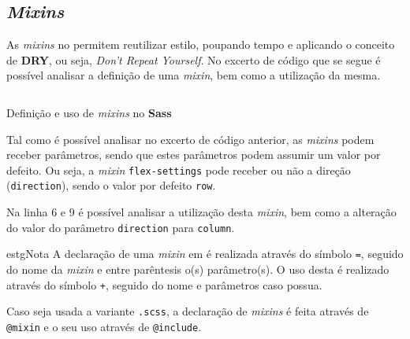 \subsection{\textit{Mixins}}

As \textit{mixins} no \textbf{} permitem reutilizar estilo, poupando tempo e aplicando o conceito de \textbf{DRY}, ou seja, \textit{Don't Repeat Yourself}. No excerto de código que se segue é possível analisar a definição de uma \textit{mixin}, bem como a utilização da mesma.

\begin{longlisting}
	\inputminted[highlightlines={6,9},highlightcolor=yellow!25]{sass}{code/sass/mixins.sass}
	\caption{Definição e uso de \textit{mixins} no \textbf{Sass}}
\end{longlisting}

Tal como é possível analisar no excerto de código anterior, as \textit{mixins} podem receber parâmetros, sendo que estes parâmetros podem assumir um valor por defeito. Ou seja, a \textit{mixin} \verb|flex-settings| pode receber ou não a direção (\verb|direction|), sendo o valor por defeito \texttt{row}.

Na linha 6 e 9 é possível analisar a utilização desta \textit{mixin}, bem como a alteração do valor do parâmetro \verb|direction| para \verb|column|.

\begin{mybox}{estg}{Nota}
	A declaração de uma \textit{mixin} em \textbf{} é realizada através do símbolo \verb|=|, seguido do nome da \textit{mixin} e entre parêntesis o(s) parâmetro(s). O uso desta é realizado através do símbolo \verb|+|, seguido do nome e parâmetros caso possua.
	
	Caso seja usada a variante \verb|.scss|, a declaração de \textit{mixins} é feita através de \verb|@mixin| e o seu uso através de \verb|@include|.
\end{mybox}
